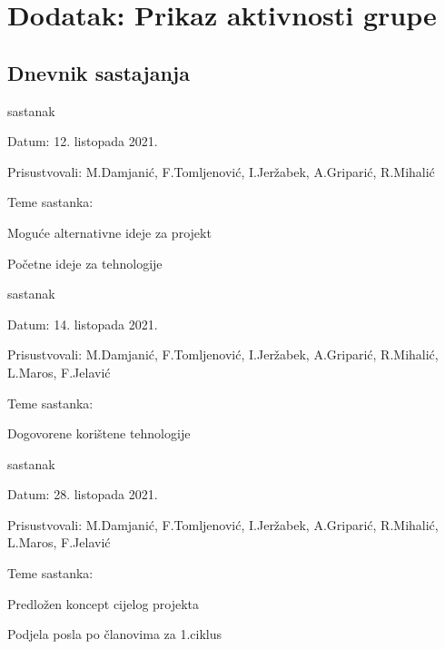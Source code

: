 \chapter*{Dodatak: Prikaz aktivnosti grupe}
		
		\section*{Dnevnik sastajanja}
		
		
		
		\begin{packed_enum}
			\item  sastanak
			
			\item[] \begin{packed_item}
				\item Datum: 12. listopada 2021. 
				\item Prisustvovali: M.Damjanić, F.Tomljenović, I.Jeržabek, A.Griparić, R.Mihalić
				\item Teme sastanka:
				\begin{packed_item}
					\item  Moguće alternativne ideje za projekt
					\item  Početne ideje za tehnologije
				\end{packed_item}
			\end{packed_item}
			
			\item  sastanak
			\item[] \begin{packed_item}
				\item Datum: 14. listopada 2021. 
				\item Prisustvovali: M.Damjanić, F.Tomljenović, I.Jeržabek, A.Griparić, R.Mihalić, L.Maros, F.Jelavić
				\item Teme sastanka:
				\begin{packed_item}
					\item  Dogovorene korištene tehnologije
				\end{packed_item}
			\end{packed_item}
		
			\item  sastanak
			\item[] \begin{packed_item}
				\item Datum: 28. listopada 2021. 
				\item Prisustvovali: M.Damjanić, F.Tomljenović, I.Jeržabek, A.Griparić, R.Mihalić, L.Maros, F.Jelavić
				\item Teme sastanka:
				\begin{packed_item}
					\item  Predložen koncept cijelog projekta
					\item  Podjela posla po članovima za 1.ciklus
				\end{packed_item}
			\end{packed_item}
		

\end{packed_enum}
